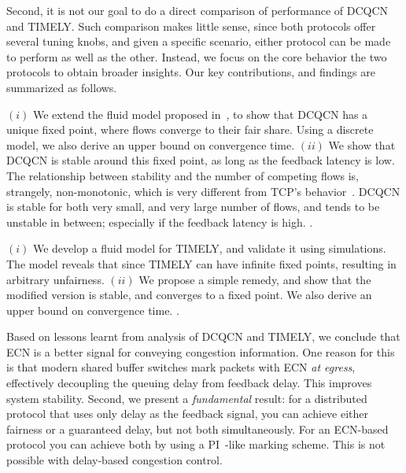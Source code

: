 Second, it is not our goal to do a direct comparison of performance of DCQCN and
TIMELY.  Such comparison makes little sense, since both protocols offer several
tuning knobs, and given a specific scenario, either protocol can be made to
perform as well as the other. Instead, we focus on the core behavior the two
protocols to obtain broader insights.  Our key contributions, and findings are
summarized as follows.

 $(i)$ We extend the fluid model proposed in~\cite{dcqcn}, to show
that DCQCN has a unique fixed point, where flows converge to their fair share.
Using a discrete model, we also derive an upper  bound on convergence time.
$(ii)$ We show that DCQCN is stable around this fixed point, as long as the
feedback latency is low. The relationship between stability and the number of
competing flows is, strangely, non-monotonic, which is very different from TCP's
behavior~\cite{misra:TAC2002}. DCQCN is stable for both very small, and very
large number of flows, and tends to be unstable in between; especially if the
feedback latency is high. .

 $(i)$ We develop a fluid model for TIMELY, and validate it using
simulations. The model reveals that since TIMELY can have infinite fixed points,
resulting in arbitrary unfairness.  $(ii)$ We propose a simple remedy, and show
that the modified version is stable, and converges to a fixed point. We also
derive an upper bound on convergence time. .

 Based on lessons learnt from analysis of DCQCN and TIMELY,
we conclude that ECN is a better signal for conveying congestion information.
One reason for this is that modern shared buffer switches mark packets with ECN
{\em at egress}, effectively decoupling the queuing delay from feedback delay.
This improves system stability. Second, we present a \emph{fundamental} result:
for a distributed protocol that uses only delay as the feedback signal, you can
achieve either fairness or a guaranteed delay, but not both simultaneously. For
an ECN-based protocol you can achieve both by using a
PI~\cite{hollot2001designing}-like marking scheme. This is not possible with
delay-based congestion control.

